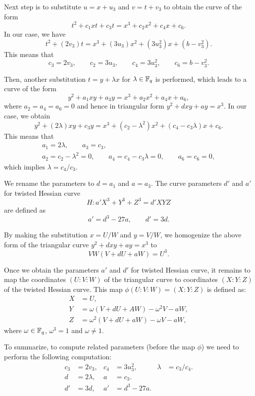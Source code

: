 Next step is to substitute $u = x + u_3$ and $v = t + v_3$
to obtain the curve of the form
$$ t^2 + c_1 xt + c_3 t = x^3 + c_2 x^2 + c_4 x + c_6. $$
In our case, we have
$$ t^2 + (2v_3)t = x^3 + (3u_3)x^2 + (3u_3^2)x + (b-v_3^2). $$
This means that
$$ c_3 = 2v_3, \qquad c_2 = 3u_3, \qquad c_4 = 3u_3^2, \qquad c_6 = b-v_3^2. $$

Then, another substitution $t = y + \lambda x$ for $\lambda \in \mathbb{F}_{q}$ is performed,
which leads to a curve of the form
$$ y^2 + a_1 xy + a_3 y = x^3 + a_2 x^2 + a_4 x + a_6, $$
where $a_2 = a_4 = a_6 = 0$ and hence in triangular form
$y^2 + dxy + ay = x^3$.
In our case, we obtain
$$ y^2 + (2\lambda)xy + c_3 y = x^3 + (c_2 - \lambda^2)x^2 + (c_4 - c_3 \lambda)x + c_6. $$
This means that
\begin{gather*}
a_1 = 2\lambda, \qquad a_3 = c_3, \\
a_2 = c_2 - \lambda^2 = 0, \qquad a_4 = c_4 - c_3 \lambda = 0, \qquad a_6 = c_6 = 0,
\end{gather*}
which implies $\lambda = c_4 / c_3$.

We rename the parameters to $d = a_1$ and $a = a_3$.
The curve parameters $d'$ and $a'$ for twisted Hessian curve
$$ H: a'X^3 + Y^3 + Z^3 = d'XYZ$$
are defined as
$$ a' = d^3 - 27a, \qquad d' = 3d. $$

By making the substitution $x = U/W$ and $y = V/W$,
we homogenize the above form of the triangular curve $y^2 + dxy + ay = x^3$ to
$$ VW(V + dU + aW) = U^3. $$

Once we obtain the parameters $a'$ and $d'$ for twisted Hessian curve,
it remains to map the coordinates $(U : V : W)$ of the triangular curve
to coordinates $(X : Y : Z)$ of the twisted Hessian curve.
This map $\phi(U:V:W) = (X:Y:Z)$ is defined as:
\begin{align*}
X &= U, \\
Y &= \omega(V + dU + AW) - \omega^2 V - aW, \\
Z &= \omega^2 (V + dU + aW) - \omega V - aW,
\end{align*}
where $\omega \in \mathbb{F}_{q}$, $\omega^3 = 1$ and $\omega \ne 1$.

To summarize, to compute related parameters (before the map $\phi$)
we need to perform the following computation:
\begin{align*}
c_3 &= 2 v_3,	&	c_4 &= 3 u_3^2,		&	\lambda &= c_3 / c_4.	\\
d &= 2 \lambda,	&	a &= c_3.		&	\\
d' &= 3 d,	&	a' &= d^3 - 27 a.	&
\end{align*}

